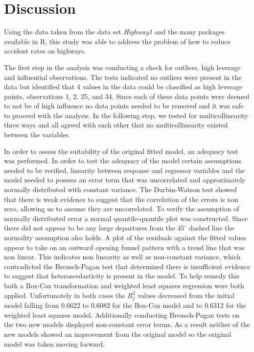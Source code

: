 \documentclass[12pt]{report}
\begin{document}
\chapter{Discussion}
Using the data taken from the data set \textit{Highway1} \cite{Data} and the many packages available in R, this study was able to address the problem of how to reduce accident rates on highways. 

The first step in the analysis was conducting a check for outliers, high leverage and influential observations. The tests indicated no outliers were present in the data but identified that 4 values in the data could be classified as high leverage points, observations 1, 2, 25, and 34. Since each of these data points were deemed to not be of high influence no data points needed to be removed and it was safe to proceed with the analysis. In the following step, we tested for multicollinearity three ways and all agreed with each other that no multicollinearity existed between the variables. 

In order to assess the suitability of the original fitted model, an adequacy test was performed. In order to test the adequacy of the model certain assumptions needed to be verified, linearity between response and regressor variables and the model needed to possess an error term that was uncorrelated and approximately normally distributed with constant variance. The Durbin-Watson test showed that there is weak evidence to suggest that the correlation of the errors is non zero, allowing us to assume they are uncorrelated. To verify the assumption of normally distributed error a normal quantile-quantile plot was constructed. Since there did not appear to be any large departures from the $45^{\circ}$ dashed line the normality assumption also holds. A plot of the residuals against the fitted values appear to take on an outward opening funnel pattern with a trend line that was non linear. This indicates non linearity as well as non-constant variance, which contradicted the Breusch-Pagan test that determined there is insufficient evidence to suggest that heteroscedasticity is present in the model. To help remedy this both a Box-Cox transformation and weighted least squares regression were both applied. Unfortunately in both cases the $R_{j}^2$ values decreased from the initial model falling from 0.6622 to 0.6082 for the Box-Cox model and to 0.6312 for the weighted least squares model. Additionally conducting Breusch-Pagan tests on the two new models displayed non-constant error terms. As a result neither of the new models showed an improvement from the original model so the original model was taken moving forward.   
\end{document}
